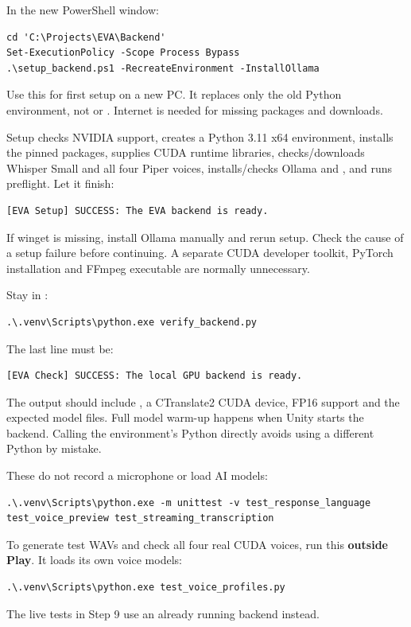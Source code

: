 \clearpage
{}
In the new PowerShell window:
\begin{lstlisting}
cd 'C:\Projects\EVA\Backend'
Set-ExecutionPolicy -Scope Process Bypass
.\setup_backend.ps1 -RecreateEnvironment -InstallOllama
\end{lstlisting}
Use this for first setup on a new PC. It replaces only the old Python environment,
not  or . Internet is needed for missing
packages and downloads.

Setup checks NVIDIA support, creates a Python 3.11 x64 environment, installs
the pinned packages, supplies CUDA runtime libraries, checks/downloads Whisper
Small and all four Piper voices, installs/checks Ollama and ,
and runs preflight. Let it finish:
\begin{lstlisting}
[EVA Setup] SUCCESS: The EVA backend is ready.
\end{lstlisting}
If winget is missing, install Ollama manually and rerun setup. Check the cause
of a setup failure before continuing. A separate CUDA developer toolkit,
PyTorch installation and FFmpeg executable are normally unnecessary.

Stay in :
\begin{lstlisting}
.\.venv\Scripts\python.exe verify_backend.py
\end{lstlisting}
The last line must be:
\begin{lstlisting}
[EVA Check] SUCCESS: The local GPU backend is ready.
\end{lstlisting}
The output should include , a CTranslate2 CUDA device,
FP16 support and the expected model files. Full model warm-up happens when Unity
starts the backend. Calling the environment's Python directly avoids using a
different Python by mistake.

These do not record a microphone or load AI models:
\begin{lstlisting}
.\.venv\Scripts\python.exe -m unittest -v test_response_language test_voice_preview test_streaming_transcription
\end{lstlisting}
To generate test WAVs and check all four real CUDA voices, run this
\textbf{outside Play}. It loads its own voice models:
\begin{lstlisting}
.\.venv\Scripts\python.exe test_voice_profiles.py
\end{lstlisting}
The live tests in Step 9 use an already running backend instead.

